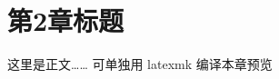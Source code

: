\documentclass[../master.tex]{subfiles}
\begin{document}
\chapter{第2章标题}
这里是正文…… 可单独用 latexmk 编译本章预览
\end{document}
